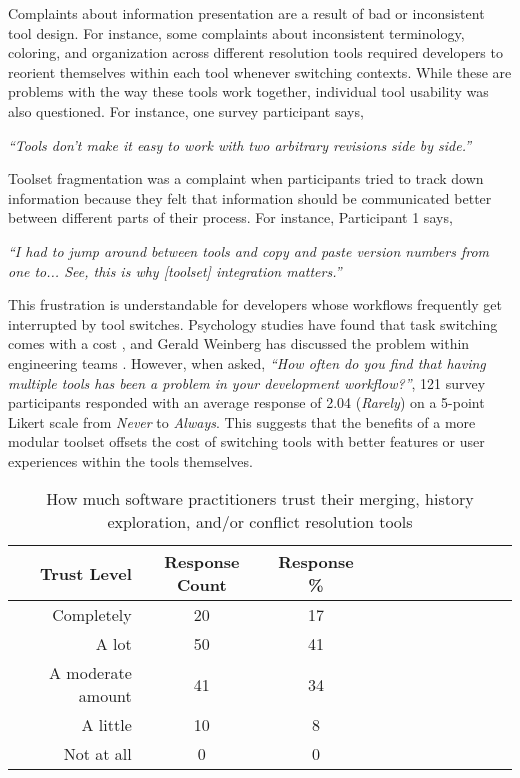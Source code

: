 
Complaints about information presentation are a result of bad or inconsistent tool design. For instance, some complaints about inconsistent terminology, coloring, and organization across different resolution tools required developers to reorient themselves within each tool whenever switching contexts. While these are problems with the way these tools work together, individual tool usability was also questioned. For instance, one survey participant says, 
\begin{displayquote}
\textit{``Tools don't make it easy to work with two arbitrary revisions side by side.''}
\end{displayquote}


Toolset fragmentation was a complaint when participants tried to track down information because they felt that information should be communicated better between different parts of their process. For instance, Participant 1 says, 

\begin{displayquote}
\textit{``I had to jump around between tools and copy and paste version numbers from one to... See, this is why [toolset] integration matters.''}
\end{displayquote}

This frustration is understandable for developers whose workflows frequently get interrupted by tool switches. Psychology studies have found that task switching comes with a cost \cite{Meiran2000}\cite{gopher2000switching}, and Gerald Weinberg has discussed the problem within engineering teams \cite{Weinberg1992}. However, when asked, \textit{``How often do you find that having multiple tools has been a problem in your development workflow?''}, 121 survey participants responded with an average response of 2.04 (\textit{Rarely}) on a 5-point Likert scale from \textit{Never} to \textit{Always}. This suggests that the benefits of a more modular toolset offsets the cost of switching tools with better features or user experiences within the tools themselves.


\begin{table}[!]
\renewcommand{\arraystretch}{1.3}
\caption{How much software practitioners trust their merging, history exploration, and/or conflict resolution tools}
\label{survey_tool_trust}
\centering
\begin{tabularx}{0.45\textwidth}{@{}r|*{10}{C}c@{}}
\toprule
Trust Level & Response Count & Response \%\\
\midrule
Completely & 20 & 17\\
A lot & 50 & 41\\
A moderate amount & 41 & 34\\
A little & 10 & 8\\
Not at all & 0 & 0\\
\bottomrule
\end{tabularx}
\end{table}

